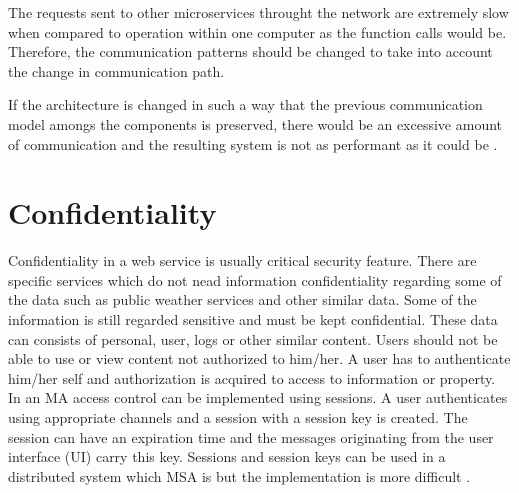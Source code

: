 \begin{sloppypar}
    The requests sent to other microservices throught the network are extremely 
    slow when compared to operation within one computer as the function calls 
    would be. Therefore, the communication patterns should be changed to take 
    into account the change in communication path.
\end{sloppypar}

\begin{sloppypar}
    If the architecture is changed in such a way that the previous communication 
    model amongs the components is preserved, there would be an excessive amount 
    of communication and the resulting system is not as performant as it could 
    be \citep{fowlerlewisms}.
\end{sloppypar}

\section{Confidentiality}
\begin{sloppypar}
    Confidentiality in a web service is usually critical security feature. 
    There are specific services which do not nead information confidentiality 
    regarding some of the data such as public weather services and other similar data.
    Some of the information is still regarded sensitive and must be kept confidential. 
    These data can consists of personal, user, logs or other similar content.
    Users should not be able to use or view content not authorized to him/her. 
    A user has to authenticate him/her self and authorization is acquired to access to information or property.
    In an MA access control can be implemented using sessions. 
    A user authenticates using appropriate channels and a session with a session key is created. 
    The session can have an expiration time and the messages originating from 
    the user interface (UI) carry this key. Sessions and session keys can be used 
    in a distributed system which MSA is but the implementation is more difficult \citep{authinmsa}.
\end{sloppypar}


